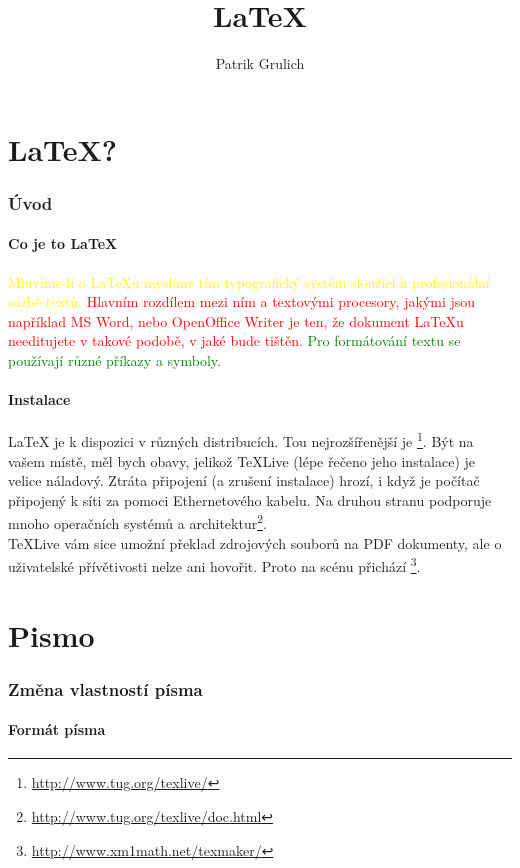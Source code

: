 \documentclass[10pt,a4paper]{article}
\title{\LaTeX{}}
\author{Patrik Grulich}
\begin{document}
	\maketitle
	\newpage
	\tableofcontents
	\newpage	
	\setcounter{page}{3}
   \part{LaTeX?}
		\section{Úvod}
    \subsection{Co je to {\LaTeX{}}}
		\textcolor{yellow}{Mluvíme-li o LaTeXu myslíme tím typografický systém sloužící k profesionální sazbě textů.} \textcolor{red}{ Hlavním rozdílem mezi ním a textovými procesory, jakými jsou například MS Word, nebo OpenOffice Writer je ten, že dokument LaTeXu needitujete v takové podobě, v jaké bude tištěn.} \textcolor{green}{ Pro formátování textu se používají různé příkazy a symboly.}\cite{rybicka}
   \subsection{Instalace}
   		LaTeX je k dispozici v různých distribucích. Tou nejrozšířenější je \footnote{\url{http://www.tug.org/texlive/}}. Být na vašem místě, měl bych obavy, jelikož TeXLive (lépe řečeno jeho instalace) je velice náladový. Ztráta připojení (a zrušení instalace) hrozí, i když je počítač připojený k síti za pomoci Ethernetového kabelu. Na druhou stranu podporuje mnoho operačních systémů a architektur\footnote{\url{http://www.tug.org/texlive/doc.html}}.
		\\
		TeXLive vám sice umožní překlad zdrojových souborů na PDF dokumenty, ale o uživatelské přívětivosti nelze ani hovořit. Proto na scénu přichází \footnote{\url{http://www.xm1math.net/texmaker/}}.	
 \newpage
 \part{Pismo}
 \section{Změna vlastností písma}
 \label{pismo}
 	\subsection{Formát písma}
			 \cite{Big}
\end{document}
